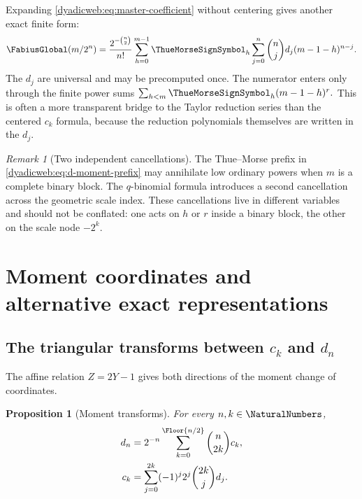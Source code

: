 \documentclass[11pt,oneside]{article}
\newtheorem{proposition}[proposition]{Proposition}
\theoremstyle{definition}
\theoremstyle{remark}
\newtheorem{remark}[remark]{Remark}
\begin{document}
Expanding \eqref{dyadicweb:eq:master-coefficient} without centering gives another exact finite form:
\begin{equation}
 \FabiusGlobal(m/2^n)
 =\frac{2^{-\binom n2}}{n!}
 \sum_{h=0}^{m-1}\ThueMorseSignSymbol_h
 \sum_{j=0}^{n}\binom njd_j(m-1-h)^{n-j}.                 \label{dyadicweb:eq:d-moment-prefix}
\end{equation}
The $d_j$ are universal and may be precomputed once.  The numerator enters only through the
finite power sums
\(
 \sum_{h<m}\ThueMorseSignSymbol_h(m-1-h)^r.
\)
This is often a more transparent bridge to the Taylor reduction series than the centered
$c_k$ formula, because the reduction polynomials themselves are written in the $d_j$.

\begin{remark}[Two independent cancellations]
The Thue--Morse prefix in \eqref{dyadicweb:eq:d-moment-prefix} may annihilate low ordinary powers when
$m$ is a complete binary block.  The $q$-binomial formula introduces a second cancellation
across the geometric scale index.  These cancellations live in different variables and should
not be conflated: one acts on $h$ or $r$ inside a binary block, the other on the scale node
$-2^k$.
\end{remark}

\section{Moment coordinates and alternative exact representations}
\label{dyadicweb:sec:moment-alternatives}

\subsection[The triangular transforms between the c and d sequences]{The triangular transforms between $c_k$ and $d_n$}

The affine relation $Z=2Y-1$ gives both directions of the moment change of coordinates.

\begin{proposition}[Moment transforms]
\label{dyadicweb:prop:moment-transforms}
For every $n,k\in\NaturalNumbers$,
\begin{align}
 d_n
 &=2^{-n}\sum_{k=0}^{\Floor{n/2}}\binom n{2k}c_k,
                                                               \label{dyadicweb:eq:d-from-c-new}\\
 c_k
 &=\sum_{j=0}^{2k}(-1)^j2^j\binom{2k}{j}d_j.              \label{dyadicweb:eq:c-from-d-new}
\end{align}
\end{proposition}
\end{document}
